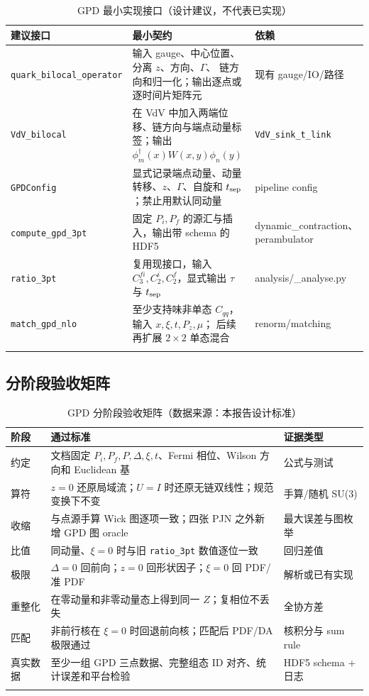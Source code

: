 \documentclass[UTF8]{ctexart}
\begin{document}
\begin{xltabular}{\textwidth}{p{4.1cm}Xp{4.2cm}}
\toprule
\textcolor{idea}{建议接口} & \textcolor{idea}{最小契约} & 依赖 \\
\midrule
\endhead
\texttt{quark\_bilocal\_operator} & 输入 gauge、中心位置、分离 $z$、方向、$\Gamma$、
链方向和归一化；输出逐点或逐时间片矩阵元 & 现有 gauge/IO/路径 \\
\texttt{VdV\_bilocal} & 在 VdV 中加入两端位移、链方向与端点动量标签；输出
$\phi_m^\dagger(x)W(x,y)\phi_n(y)$ & \texttt{VdV\_sink\_t\_link} \\
\texttt{GPDConfig} & 显式记录端点动量、动量转移、$z$、$\Gamma$、自旋和
$t_{\rm sep}$；禁止用默认同动量 & pipeline config \\
\texttt{compute\_gpd\_3pt} & 固定 $P_i,P_f$ 的源汇与插入，输出带 schema 的 HDF5 &
dynamic\_contraction、perambulator \\
\texttt{ratio\_3pt} & 复用现接口，输入 $C_3^{fi},C_2^{i},C_2^{f}$，显式输出
$\tau$ 与 $t_{\rm sep}$ & analysis/\_analyse.py \\
\texttt{match\_gpd\_nlo} & 至少支持味非单态 $C_{qq}$，输入 $x,\xi,t,P_z,\mu$；
后续再扩展 $2\times2$ 单态混合 & renorm/matching \\
\bottomrule
\caption{GPD 最小实现接口（设计建议，不代表已实现）}
\end{xltabular}

\subsection{分阶段验收矩阵}

\begin{xltabular}{\textwidth}{p{1.2cm}Xp{2.0cm}}
\toprule
\textcolor{struct}{阶段} & \textcolor{struct}{通过标准} & 证据类型 \\
\midrule
\endhead
约定 & 文档固定 $P_i,P_f,P,\Delta,\xi,t$、Fermi 相位、Wilson 方向和 Euclidean 基 &
公式与测试 \\
算符 & $z=0$ 还原局域流；$U=I$ 时还原无链双线性；规范变换下不变 &
手算/随机 SU(3) \\
收缩 & 与点源手算 Wick 图逐项一致；四张 PJN 之外新增 GPD 图 oracle &
最大误差与图枚举 \\
比值 & 同动量、$\xi=0$ 时与旧 \texttt{ratio\_3pt} 数值逐位一致 &
回归差值 \\
极限 & $\Delta=0$ 回前向；$z=0$ 回形状因子；$\xi=0$ 回 PDF/准 PDF &
解析或已有实现 \\
重整化 & 在零动量和非零动量态上得到同一 $Z$；复相位不丢失 & 全协方差 \\
匹配 & 非前行核在 $\xi=0$ 时回退前向核；匹配后 PDF/DA 极限通过 &
核积分与 sum rule \\
真实数据 & 至少一组 GPD 三点数据、完整组态 ID 对齐、统计误差和平台检验 &
HDF5 schema + 日志 \\
\bottomrule
\caption{GPD 分阶段验收矩阵（数据来源：本报告设计标准）}
\end{xltabular}
\end{document}
